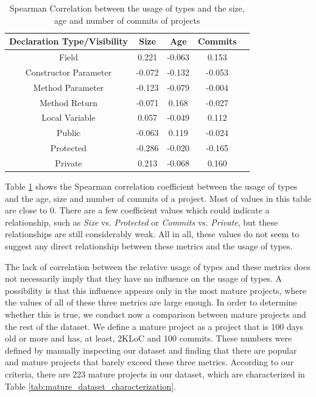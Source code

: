 \documentclass[]{sigplanconf}
\begin{document}
\begin{table}[h!]
\small
\centering{}%
\begin{tabular}{|c|c|c|c|c|}
\hline 
Declaration Type/Visibility	& Size		& Age	&	Commits\\
\hline 
\hline 
Field						&  0.221	& -0.063	&  0.153	\\ \hline
Constructor Parameter		& -0.072	& -0.132	& -0.053	\\ \hline
Method Parameter			& -0.123	& -0.079	& -0.004	\\ \hline
Method Return				& -0.071	&  0.168	& -0.027	\\ \hline
Local Variable		 		&  0.057	& -0.049	&  0.112	\\ 
\hline 			 
\hline 		 
Public						& -0.063	&   0.119	& -0.024	\\ \hline
Protected					& -0.286	&  -0.020	& -0.165	\\ \hline
Private				 		&  0.213	&  -0.068	&  0.160	\\ \hline
\end{tabular}
\caption{Spearman Correlation between the usage of types and the size, age and number of commits of projects}
\label{tab:all_correlation_maturity}
\end{table}	

Table \ref{tab:all_correlation_maturity} shows the Spearman correlation coefficient between the usage of types and the age, size and number of commits of a project.
Most of values in this table are close to 0.
There are a few coefficient values which could indicate a relationship, such as \emph{Size} vs. \emph{Protected} or \emph{Commits} vs. \emph{Private}, but these relationships are still considerably weak.
All in all, these values do not seem to suggest any direct relationship between these metrics and the usage of types.

The lack of correlation between the relative usage of types and these metrics does not necessarily imply that they have no influence on the usage of types.
A possibility is that this influence appears only in the most mature projects, where the values of all of these three metrics are large enough.
In order to determine whether this is true, we conduct now a comparison between mature projects and the rest of the dataset.
We define a mature project as a project that is 100 days old or more and has, at least, 2KLoC and 100 commits.
These numbers were defined by manually inspecting our dataset and finding that there are popular and mature projects that barely exceed these three metrics.
According to our criteria, there are 223 mature projects in our dataset, which are characterized in Table \ref{tab:mature_dataset_characterization}.
\end{document}
